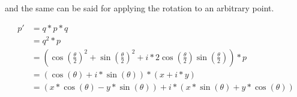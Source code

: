 		and the same can be said for applying the rotation to an arbitrary point.
		
		\begin{equation}
		\begin{split}
			p' 	&= q*p*q \\
				&= q^2*p \\
				&= (\cos(\frac{\theta}{2})^2 + \sin(\frac{\theta}{2})^2 + i*2\cos(\frac{\theta}{2})\sin(\frac{\theta}{2}))*p \\
				&= (\cos(\theta) + i*\sin(\theta))*(x + i*y) \\
				&= (x*\cos(\theta) - y*\sin(\theta)) + i*(x*\sin(\theta) + y*\cos(\theta)) \\
		\end{split}
		\end{equation}
			










